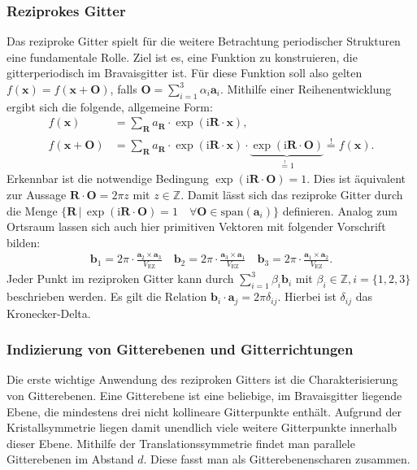 \subsubsection{Reziprokes Gitter}
Das reziproke Gitter spielt für die weitere Betrachtung periodischer Strukturen eine fundamentale Rolle.
Ziel ist es, eine Funktion zu konstruieren, die gitterperiodisch im Bravaisgitter ist.
Für diese Funktion soll also gelten
$f(\mathbf{x})=f(\mathbf{x}+\mathbf{O})$, falls $\mathbf{O}=\sum_{i=1}^{3} \alpha_{i}\mathbf{a}_{i}$.
Mithilfe einer Reihenentwicklung ergibt sich die folgende, allgemeine Form:
\begin{align}
    f(\mathbf{x})&=\sum_{\mathbf{R}}a_{\mathbf{R}}\cdot \exp(\mathrm{i}\mathbf{R}\cdot\mathbf{x}),\\
    f(\mathbf{x}+\mathbf{O})&=\sum_{\mathbf{R}}a_{\mathbf{R}}\cdot \exp(\mathrm{i}\mathbf{R}\cdot \mathbf{x})\cdot
    \underbrace{ \exp(\mathrm{i}\mathbf{R}\cdot \mathbf{O}) }_{ \stackrel{!}{=}1 }  \stackrel{!}{=} f(\mathbf{x}).
\end{align}
Erkennbar ist die notwendige Bedingung $\exp(\mathrm{i}\mathbf{R}\cdot \mathbf{O})=1$.
Dies ist äquivalent zur Aussage $\mathbf{R}\cdot \mathbf{O}=2\pi z$ mit $z \in \mathbb{Z}$.
Damit lässt sich das reziproke Gitter durch die Menge
$\{ \mathbf{R} \,\vert\, \exp(\mathrm{i}\mathbf{R}\cdot \mathbf{O})=1 \quad
\forall \mathbf{O} \in \text{span}(\mathbf{a}_{i}) \}$ definieren. \autocite[108]{Ashcroft}
Analog zum Ortsraum lassen sich auch hier primitiven Vektoren mit folgender Vorschrift bilden:
\begin{align*}
    \mathbf{b}_{1} = 2\pi \cdot \frac{\mathbf{a}_{2} \times \mathbf{a}_{3}}{V_{\mathrm{EZ}}} \quad
    \mathbf{b}_{2} = 2\pi \cdot \frac{\mathbf{a}_{3} \times \mathbf{a}_{1}}{V_{\mathrm{EZ}}} \quad
    \mathbf{b}_{3} = 2\pi \cdot \frac{\mathbf{a}_{1} \times \mathbf{a}_{2}}{V_{\mathrm{EZ}}}.
\end{align*}
Jeder Punkt im reziproken Gitter kann durch $\sum_{i=1}^{3} \beta_{i}\mathbf{b}_{i}$ mit $\beta_i \in \mathbb{Z}, i=\{1,2,3\}$
beschrieben werden.
Es gilt die Relation $\mathbf{b}_{i}\cdot \mathbf{a}_{j}=2 \pi \delta_{ij}$.
Hierbei ist $\delta_{ij}$ das Kronecker-Delta.
\autocite[109]{Ashcroft}

\subsubsection{Indizierung von Gitterebenen und Gitterrichtungen}\label{subsubsec:indizierung}
Die erste wichtige Anwendung des reziproken Gitters ist die Charakterisierung von Gitterebenen.
Eine Gitterebene ist eine beliebige, im Bravaisgitter liegende Ebene, die mindestens drei nicht kollineare Gitterpunkte
enthält.
Aufgrund der Kristallsymmetrie liegen damit unendlich viele weitere Gitterpunkte innerhalb dieser Ebene.
Mithilfe der Translationssymmetrie findet man parallele Gitterebenen im Abstand $d$.
Diese fasst man als Gitterebenenscharen zusammen. \autocite[113]{Ashcroft}


